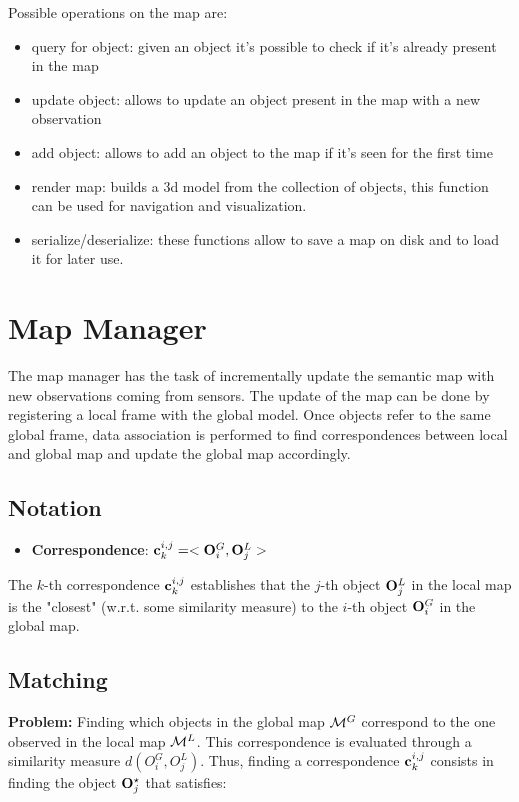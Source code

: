 \documentclass{article}
\begin{document}
	Possible operations on the map are:
	
	\begin{itemize}
		\item query for object: given an object it's possible to check if it's already present in the map
		\item update object: allows to update an object present in the map with a new observation
		\item add object: allows to add an object to the map if it's seen for the first time
		\item render map: builds a 3d model from the collection of objects, this function can be used for navigation and visualization.
		\item serialize/deserialize: these functions allow to save a map on disk and to load it for later use.
	\end{itemize}
	
	\section{Map Manager}
	
	The map manager has the task of incrementally update the semantic map with new observations coming from sensors. The update of the map can be done by registering a local frame with the global model. Once objects refer to the same global frame, data association is performed to find correspondences between local and global map and update the global map accordingly.
	
	\subsection{Notation}
	
	\begin{itemize}
		\item {\bf Correspondence}: $ \mathbf{c}^{i,j}_k = <\mathbf{O}_i^G,\mathbf{O}_j^L> $
	\end{itemize}
	
	The $k$-th correspondence $ \mathbf{c}^{i,j}_k$ establishes that the $j$-th object $\mathbf{O}_j^L$ in the local map is the "closest" (w.r.t. some similarity measure) to the $i$-th object $\mathbf{O}_i^G$ in the global map.
	
	\subsection{Matching} 
	
	{\bf Problem: }	Finding which objects in the global map $\mathcal{M}^G$ correspond to the one observed in the local map $\mathcal{M}^L$. This correspondence is evaluated through a similarity measure $d(O_i^G,O_j^L)$. Thus, finding a correspondence $\mathbf{c}^{i,j}_k$ consists in finding the object $\mathbf{O}_j^\star$ that satisfies:
	
\end{document}
